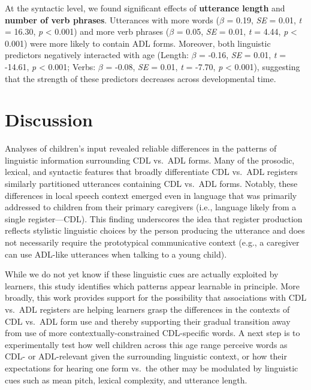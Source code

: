 \documentclass[10pt, letterpaper]{article}
\begin{document}
At the syntactic level, we found significant effects of
\textbf{utterance length} and \textbf{number of verb phrases}.
Utterances with more words (\(\beta\) = 0.19, \emph{SE} = 0.01, \emph{t}
= 16.30, \emph{p} \textless{} 0.001) and more verb phrases (\(\beta\) =
0.05, \emph{SE} = 0.01, \emph{t} = 4.44, \emph{p} \textless{} 0.001)
were more likely to contain ADL forms. Moreover, both linguistic
predictors negatively interacted with age (Length: \(\beta\) = -0.16,
\emph{SE} = 0.01, \emph{t} = -14.61, \emph{p} \textless{} 0.001; Verbs:
\(\beta\) = -0.08, \emph{SE} = 0.01, \emph{t} = -7.70, \emph{p}
\textless{} 0.001), suggesting that the strength of these predictors
decreases across developmental time.

\hypertarget{discussion-1}{%
\section{Discussion}\label{discussion-1}}

Analyses of children's input revealed reliable differences in the
patterns of linguistic information surrounding CDL vs.~ADL forms. Many
of the prosodic, lexical, and syntactic features that broadly
differentiate CDL vs.~ADL registers similarly partitioned utterances
containing CDL vs.~ADL forms. Notably, these differences in local speech
context emerged even in language that was primarily addressed to
children from their primary caregivers (i.e., language likely from a
single register---CDL). This finding underscores the idea that register
production reflects stylistic linguistic choices by the person producing
the utterance and does not necessarily require the prototypical
communicative context (e.g., a caregiver can use ADL-like utterances
when talking to a young child).

While we do not yet know if these linguistic cues are actually exploited
by learners, this study identifies which patterns appear learnable in
principle. More broadly, this work provides support for the possibility
that associations with CDL vs.~ADL registers are helping learners grasp
the differences in the contexts of CDL vs.~ADL form use and thereby
supporting their gradual transition away from use of more
contextually-constrained CDL-specific words. A next step is to
experimentally test how well children across this age range perceive
words as CDL- or ADL-relevant given the surrounding linguistic context,
or how their expectations for hearing one form vs.~the other may be
modulated by linguistic cues such as mean pitch, lexical complexity, and
utterance length.
\end{document}
